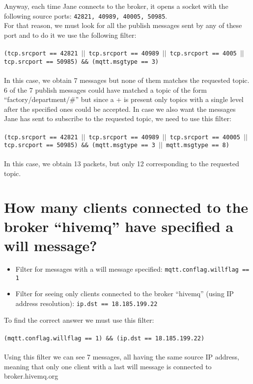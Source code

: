 \documentclass{article} %
\begin{document}
    Anyway, each time Jane connects to the broker, it opens a socket with the following source ports: \texttt{42821, 40989, 40005, 50985}.\\
    For that reason, we must look for all the publish messages sent by any of these port and to do it we use the following filter: \\ \\
    \texttt{(tcp.srcport == 42821 $||$ tcp.srcport == 40989 $||$ tcp.srcport == 4005 $||$ tcp.srcport == 50985) \&\& (mqtt.msgtype == 3)} \\ \\
    In this case, we obtain 7 messages but none of them matches the requested topic. 6 of the 7 publish messages could have matched a topic of the
    form “factory/department\*/\#” but since a + is present only topics with a single level after the specified ones could be accepted.
    In case we also want the messages Jane has sent to subscribe to the requested topic, we need to use this filter: \\ \\ 
    \texttt{(tcp.srcport == 42821 $||$ tcp.srcport == 40989 $||$ tcp.srcport == 40005 $||$ tcp.srcport == 50985) \&\&  (mqtt.msgtype == 3 $||$ mqtt.msgtype == 8)} \\ \\
    In this case, we obtain 13 packets, but only 12 corresponding to the requested topic.
 

\section{\large{How many clients connected to the broker “hivemq” have specified a will message?}}
    \begin{itemize}
        \item Filter for messages with a will message specified: \texttt{mqtt.conflag.willflag == 1}
        \item Filter for seeing only clients connected to the broker “hivemq” (using IP address resolution): \texttt{ip.dst == 18.185.199.22}
    \end{itemize}
    To find the correct answer we must use this filter: \\ \\
    \texttt{(mqtt.conflag.willflag == 1) \&\& (ip.dst == 18.185.199.22)} \\ \\
    Using this filter we can see 7 messages, all having the same source IP address, meaning that only one client with a last will message is connected to broker.hivemq.org
\end{document}
